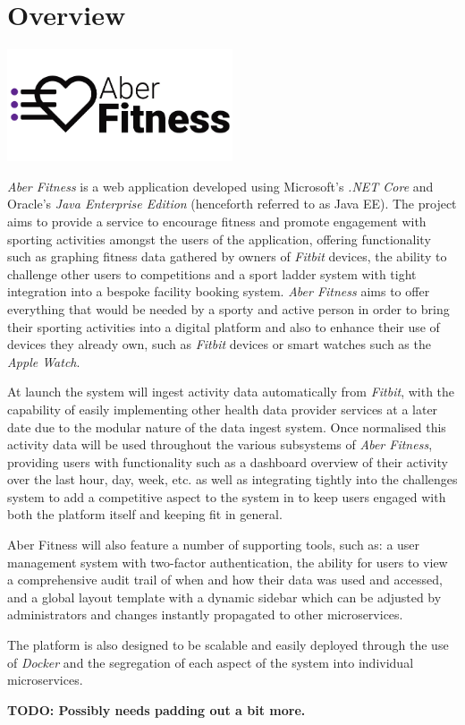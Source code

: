 \chapter{Overview}

\begin{center}
	\includegraphics[width=0.5\textwidth]{Images/aberfitness.png}
\end{center}

\par
\textit{Aber Fitness} is a web application developed using Microsoft's \textit{.NET Core} and Oracle's \textit{Java Enterprise Edition} (henceforth referred to as Java EE). The project aims to provide a service to encourage fitness and promote engagement with sporting activities amongst the users of the application, offering functionality such as graphing fitness data gathered by owners of \textit{Fitbit} devices, the ability to challenge other users to competitions and a sport ladder system with tight integration into a bespoke facility booking system. \textit{Aber Fitness} aims to offer everything that would be needed by a sporty and active person in order to bring their sporting activities into a digital platform and also to enhance their use of devices they already own, such as \textit{Fitbit} devices or smart watches such as the \textit{Apple Watch}.

\par
At launch the system will ingest activity data automatically from \textit{Fitbit}, with the capability of easily implementing other health data provider services at a later date due to the modular nature of the data ingest system. Once normalised this activity data will be used throughout the various subsystems of \textit{Aber Fitness}, providing users with functionality such as a dashboard overview of their activity over the last hour, day, week, etc. as well as integrating tightly into the challenges system to add a competitive aspect to the system in to keep users engaged with both the platform itself and keeping fit in general. 

Aber Fitness will also feature a number of supporting tools, such as: a user management system with two-factor authentication, the ability for users to view a comprehensive audit trail of when and how their data was used and accessed, and a global layout template with a dynamic sidebar which can be adjusted by administrators and changes instantly propagated to other microservices. 

The platform is also designed to be scalable and easily deployed through the use of \textit{Docker} and the segregation of each aspect of the system into individual microservices. 

\textbf{TODO: Possibly needs padding out a bit more.}